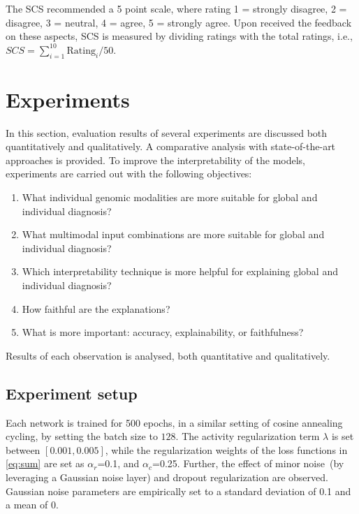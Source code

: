 \hspace*{3.5mm} The SCS recommended a 5 point scale, where rating 1 = strongly disagree, 2 = disagree, 3 = neutral, 4 = agree, 5 = strongly agree. Upon received the feedback on these aspects, SCS is measured by dividing ratings with the total ratings, i.e., $SCS  = \sum_{i=1}^{10} \text {Rating}_{i} / 50$. 

\section{Experiments}\label{chapter_5:results} 
In this section, evaluation results of several experiments are discussed both quantitatively and qualitatively. A comparative analysis with state-of-the-art approaches is provided. To improve the interpretability of the models, experiments are carried out with the following objectives:

\begin{enumerate}[noitemsep]
    \item What individual genomic modalities are more suitable for global and individual diagnosis? 
    \item What multimodal input combinations are more suitable for global and individual diagnosis?
    \item Which interpretability technique is more helpful for explaining global and individual diagnosis?
    \item How faithful are the explanations? 
    \item What is more important: accuracy, explainability, or faithfulness?
\end{enumerate}

\hspace*{3.5mm} Results of each observation is analysed, both quantitative and qualitatively. 

\subsection{Experiment setup}
Each network is trained for 500 epochs, in a similar setting of cosine annealing cycling, by setting the batch size to $128$. The activity regularization term $\lambda$ is set between $[0.001, 0.005]$, while the regularization weights of the loss functions in \cref{eq:sum} are set as  $\alpha_{r}$=0.1, and $\alpha_{c}$=0.25. Further, the effect of minor noise~(by leveraging a Gaussian noise layer) and dropout regularization are observed. Gaussian noise parameters are empirically set to a standard deviation of 0.1 and a mean of 0.


